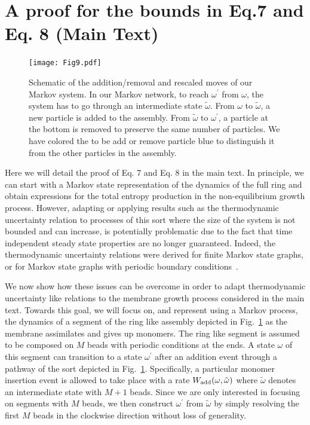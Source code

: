 \documentclass[amsmath,preprintnumbers,10pt,nofootinbib,prl,twocolumn]{revtex4-1}
\begin{document}
\section{A proof for the bounds in Eq.7 and Eq. 8 (Main Text) }
\begin{figure}[tbp]
\texttt{[image: Fig9.pdf]}
\caption{ Schematic of the addition/removal and rescaled moves of our Markov system. In our Markov network, to reach $\omega^\prime$ from $\omega$, the system has to go through an intermediate state $\tilde{\omega}$. From $\omega$ to $\tilde{\omega}$, a new particle is added to the assembly. From $\tilde{\omega}$ to $\omega^\prime$, a particle at the bottom is removed to preserve the same number of particles. We have colored the to be add or remove particle blue to distinguish it from the other particles in the assembly.}
\label{fig:MarkovSchematic}
\end{figure}
Here we will detail the proof of Eq. 7 and Eq. 8 in the main text. In principle, we can start with a Markov state representation of the dynamics of the full ring and obtain expressions for the total entropy production in the non-equilibrium growth process. However, adapting or applying results such as the thermodynamic uncertainty relation to processes of this sort where the size of the system is not bounded and can increase, is potentially problematic due to the fact that time independent steady state properties are no longer guaranteed. Indeed, the thermodynamic uncertainty relations were derived for finite Markov state graphs, or for Markov state graphs with periodic boundary conditions~\cite{Barato2015,Gingrich2016}. 

We now show how these issues can be overcome in order to adapt thermodynamic uncertainty like relations to the membrane growth process considered in the main text. Towards this goal, we will focus on, and represent using a Markov process, the dynamics of a segment of the ring like assembly depicted in Fig.~\ref{fig:MarkovSchematic} as the membrane assimilates and gives up monomers. The ring like segment is assumed to be composed on $M$ beads with periodic conditions at the ends. A state $\omega$ of this segment can transition to a state $\omega^{\prime}$ after an addition event through a pathway of the sort depicted in Fig.~\ref{fig:MarkovSchematic}. Specifically, a particular monomer insertion event is allowed to take place with a rate $W_{\rm add}(\omega,\tilde{\omega})$ where $\tilde\omega$ denotes an intermediate state with $M+1$ beads. Since we are only interested in focusing on segments with $M$ beads, we then construct $\omega^\prime$ from $\tilde\omega$ by simply resolving the first $M$ beads in the clockwise direction without loss of generality. 
\end{document}
